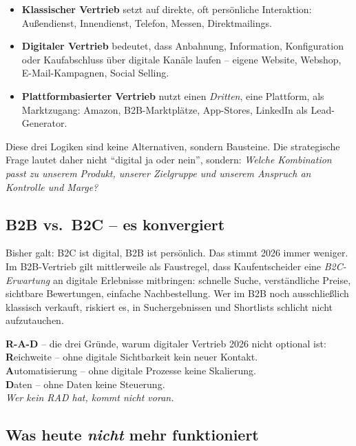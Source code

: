 \documentclass[11pt,a4paper,oneside]{article}
\newcommand{\caveatfontfallback}{\itshape}
\newcommand\caveatfont{\caveatfontfallback}%
\newcommand{\akzent}[1]{{\caveatfont\color{lpAmber}#1}}
\newcommand{\fachbegriff}[1]{\textbf{#1}}
\begin{document}
\begin{itemize}
  \item \fachbegriff{Klassischer Vertrieb} setzt auf direkte, oft persönliche Interaktion: Außendienst, Innendienst, Telefon, Messen, Direktmailings.
  \item \fachbegriff{Digitaler Vertrieb} bedeutet, dass Anbahnung, Information, Konfiguration oder Kaufabschluss über digitale Kanäle laufen -- eigene Website, Webshop, E-Mail-Kampagnen, Social Selling.
  \item \fachbegriff{Plattformbasierter Vertrieb} nutzt einen \emph{Dritten}, eine Plattform, als Marktzugang: Amazon, B2B-Marktplätze, App-Stores, LinkedIn als Lead-Generator.
\end{itemize}

Diese drei Logiken sind keine Alternativen, sondern Bausteine. Die strategische Frage lautet daher nicht ``digital ja oder nein'', sondern: \emph{Welche Kombination passt zu unserem Produkt, unserer Zielgruppe und unserem Anspruch an Kontrolle und Marge?}

\subsection{B2B vs.\ B2C -- es konvergiert}

Bisher galt: B2C ist digital, B2B ist persönlich. Das stimmt 2026 immer weniger. Im B2B-Vertrieb gilt mittlerweile als Faustregel, dass Kaufentscheider eine \emph{B2C-Erwartung} an digitale Erlebnisse mitbringen: schnelle Suche, verständliche Preise, sichtbare Bewertungen, einfache Nachbestellung. Wer im B2B noch ausschließlich klassisch verkauft, riskiert es, in Suchergebnissen und Shortlists schlicht nicht aufzutauchen.

\begin{eselsbox}[Eselsbrücke: \akzent{R-A-D}]
\textbf{R-A-D} -- die drei Gründe, warum digitaler Vertrieb 2026 nicht optional ist:\\[2pt]
\textbf{R}eichweite -- ohne digitale Sichtbarkeit kein neuer Kontakt.\\
\textbf{A}utomatisierung -- ohne digitale Prozesse keine Skalierung.\\
\textbf{D}aten -- ohne Daten keine Steuerung.\\[2pt]
\emph{Wer kein RAD hat, kommt nicht voran.}
\end{eselsbox}

\subsection{Was heute \emph{nicht} mehr funktioniert}
\end{document}
